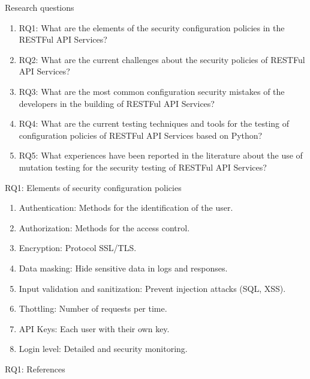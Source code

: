 \documentclass[10pt]{beamer}
\theoremstyle{remark}
\theoremstyle{definition}
\begin{document}
\begin{frame}{Research questions}
	\begin{enumerate}
    \item RQ1: What are the elements of the security configuration policies in the RESTFul API Services?
		\item RQ2: What are the current challenges about the security policies of RESTFul API Services?
    \item RQ3: What are the most common configuration security mistakes of the developers in the building of RESTFul API Services?
    \item RQ4: What are the current testing techniques and tools for the testing of configuration policies of RESTFul API Services based on Python?
    \item RQ5: What experiences have been reported in the literature about the use of mutation testing for the security testing of RESTFul API Services?
	\end{enumerate}
\end{frame}

\nocite{*}

\begin{frame}{RQ1: Elements of security configuration policies}
  \begin{enumerate}
    \item Authentication: Methods for the identification of the user.
      \item Authorization: Methods for the access control.
    \item Encryption: Protocol SSL/TLS.
    \item Data masking: Hide sensitive data in logs and responses.
    \item Input validation and sanitization: Prevent injection attacks (SQL, XSS).
    \item Thottling: Number of requests per time.
    \item API Keys: Each user with their own key.
    \item Login level: Detailed and security monitoring.
  \end{enumerate}
\end{frame}

\begin{frame}[allowframebreaks]{RQ1: References}
  \printbibliography[keyword={RQ1}]
\end{frame}
  
\end{document}
